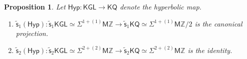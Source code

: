 \documentclass[11pt,hyp,english]{article}
\newcommand{\Z}{\mathbb{Z}}
\newcommand{\KGL}{\mathsf{KGL}}
\newcommand{\KQ}{\mathsf{KQ}}
\newcommand{\HZ}{\mathsf{M}\Z}
\newcommand{\cHZ}{\wt{{\mathsf{M}}}{\Z}}
\newcommand{\wt}[1]{\widetilde{#1}}
\newcommand{\vs}{\tilde{\mathsf{s}}}
\newcommand{\Hyper}{\mathsf{Hyp}}
\newtheorem{proposition}[theorem]{Proposition}
\theoremstyle{definition}
\begin{document}
\begin{proposition}\label{prop:veff-hyper}
Let $\Hyper:\KGL \to \KQ$ denote the hyperbolic map.
\begin{enumerate}
\item\label{it:vs1-hyper} 
$\vs_1(\Hyper)\colon\vs_1\KGL\simeq\Sigma^{1+(1)}\HZ\to\vs_1\KQ \simeq\Sigma^{1+(1)}\HZ/2$ 
is the canonical projection.
\item\label{it:vs2-hyper} 
$\vs_2(\Hyper)\colon \vs_2\KGL\simeq\Sigma^{2+(2)}\HZ\to \vs_2\KQ \simeq\Sigma^{2+(2)}\HZ$ is the identity.
\end{enumerate}
\end{proposition}
\end{document}
